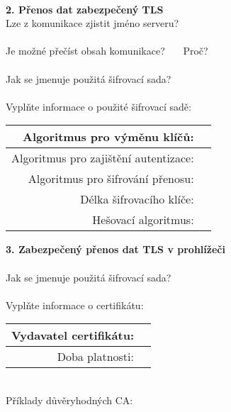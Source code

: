 \documentclass[a4paper,11pt]{article}
\begin{document}
~\\
\textbf{2. Přenos dat zabezpečený TLS} \\
Lze z komunikace zjistit jméno serveru? \underline{\hspace{1cm}}\\
~\\
Je možné přečíst obsah komunikace? \underline{\hspace{1cm}}~~~Proč?~\underline{\hspace{8cm}}\\
~\\
Jak se jmenuje použitá šifrovací sada? \underline{\hspace{7cm}}\\
~\\
Vyplňte informace o použité šifrovací sadě:\\
\renewcommand\arraystretch{1.3}
\begin{tabular}{|r|r|}
\hline
Algoritmus pro výměnu klíčů: & \hspace{25.2em} \\ \hline
Algoritmus pro zajištění autentizace: & \\ \hline
Algoritmus pro šifrování přenosu: & \\ \hline
Délka šifrovacího klíče: & \\ \hline
Hešovací algoritmus: & \\ \hline
\end{tabular}
\renewcommand\arraystretch{1}
\vspace{0.5cm}

\textbf{3. Zabezpečený přenos dat TLS v prohlížeči} \\
~\\
Jak se jmenuje použitá šifrovací sada? \underline{\hspace{7cm}}\\
~\\
Vyplňte informace o certifikátu:\\
\renewcommand\arraystretch{1.3}
\begin{tabular}{|r|r|}
\hline
Vydavatel certifikátu: & \hspace{15em} \\ \hline
Doba platnosti: & \\ \hline
\end{tabular}
\renewcommand\arraystretch{1}
\vspace{0.5cm}
~\\
Příklady důvěryhodných CA: \underline{\hspace{11,7cm}}\\
\end{document}
